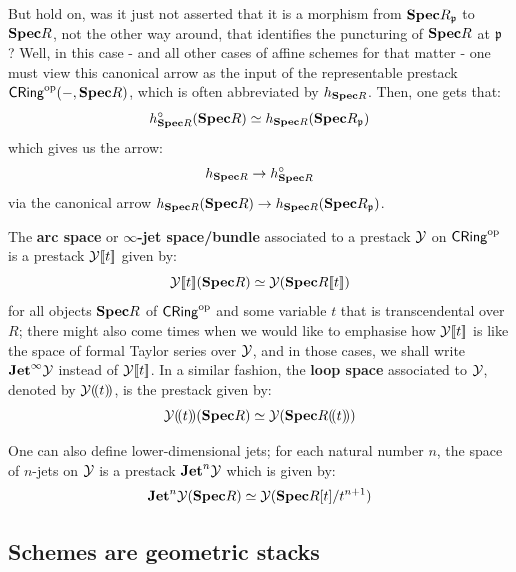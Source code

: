 \begin{example}
            But hold on, was it just not asserted that it is a morphism from $\mathbf{Spec} R_{\mathfrak{p}}$ to $\mathbf{Spec} R$, not the other way around, that identifies the puncturing of $\mathbf{Spec} R$ at $\mathfrak{p}$ ? Well, in this case - and all other cases of affine schemes for that matter - one must view this canonical arrow as the input of the representable prestack $\mathsf{CRing}^{\mathrm{op}}(-, \mathbf{Spec} R)$, which is often abbreviated by $h_{\mathbf{Spec} R}$. Then, one gets that:
                $$h_{\mathbf{Spec} R}^{\circ}(\mathbf{Spec} R) \simeq h_{\mathbf{Spec} R}(\mathbf{Spec} R_{\mathfrak{p}})$$
            which gives us the  arrow:
                $$h_{\mathbf{Spec} R} \to h_{\mathbf{Spec} R}^{\circ}$$
            via the canonical arrow $h_{\mathbf{Spec} R}(\mathbf{Spec} R) \to h_{\mathbf{Spec} R}(\mathbf{Spec} R_{\mathfrak{p}})$. 
        \end{example}
        
        \begin{example} \label{example: multi_punctured_prestacks}
        
        \end{example}
        
        \begin{example} \label{example: arcs_and_loops}
            The \textbf{arc space} or \textbf{$\infty$-jet space/bundle} associated to a prestack $\mathcal{Y}$ on $\mathsf{CRing}^{\mathrm{op}}$ is a prestack $\mathcal{Y}[\![t]\!]$ given by:
                $$\mathcal{Y}[\![t]\!](\mathbf{Spec} R) \simeq \mathcal{Y}(\mathbf{Spec} R [\![t]\!])$$
            for all objects $\mathbf{Spec} R$ of $\mathsf{CRing}^{\mathrm{op}}$ and some variable $t$ that is transcendental over $R$; there might also come times when we would like to emphasise how $\mathcal{Y}[\![t]\!]$ is like the space of formal Taylor series over $\mathcal{Y}$, and in those cases, we shall write $\mathbf{Jet}^{\infty}\mathcal{Y}$ instead of $\mathcal{Y}[\![t]\!]$. In a similar fashion, the \textbf{loop space} associated to $\mathcal{Y}$, denoted by $\mathcal{Y} (\!(t)\!)$, is the prestack given by:
                $$\mathcal{Y}(\!(t)\!)(\mathbf{Spec} R) \simeq \mathcal{Y}(\mathbf{Spec} R (\!(t)\!))$$
                
            One can also define lower-dimensional jets; for each natural number $n$, the space of $n$-jets on $\mathcal{Y}$ is a prestack $\mathbf{Jet}^n\mathcal{Y}$ which is given by:
                $$\mathbf{Jet}^n\mathcal{Y}(\mathbf{Spec} R) \simeq \mathcal{Y}(\mathbf{Spec} R[t]/t^{n + 1})$$
        \end{example}
    
        \subsection{Schemes are geometric stacks}
